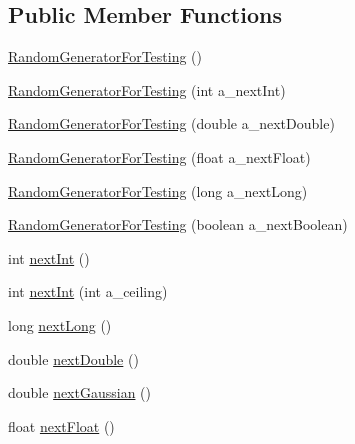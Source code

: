 \subsection*{Public Member Functions}
\begin{DoxyCompactItemize}
\item 
\hyperlink{classorg_1_1jgap_1_1impl_1_1_random_generator_for_testing_ab8a748759c1fdf976af85b5d88cb1b51}{Random\-Generator\-For\-Testing} ()
\item 
\hyperlink{classorg_1_1jgap_1_1impl_1_1_random_generator_for_testing_ae3a92dd2124c47e246d238b9743c7152}{Random\-Generator\-For\-Testing} (int a\-\_\-next\-Int)
\item 
\hyperlink{classorg_1_1jgap_1_1impl_1_1_random_generator_for_testing_afef3e231a7d3b2ef02b6bf8360e644b1}{Random\-Generator\-For\-Testing} (double a\-\_\-next\-Double)
\item 
\hyperlink{classorg_1_1jgap_1_1impl_1_1_random_generator_for_testing_a3f949d34641acf47a090e30a59553bb1}{Random\-Generator\-For\-Testing} (float a\-\_\-next\-Float)
\item 
\hyperlink{classorg_1_1jgap_1_1impl_1_1_random_generator_for_testing_a9ae2b4d98da1324479a462964051131d}{Random\-Generator\-For\-Testing} (long a\-\_\-next\-Long)
\item 
\hyperlink{classorg_1_1jgap_1_1impl_1_1_random_generator_for_testing_a3960916ba205bcfacf4ef29a30e3f295}{Random\-Generator\-For\-Testing} (boolean a\-\_\-next\-Boolean)
\item 
int \hyperlink{classorg_1_1jgap_1_1impl_1_1_random_generator_for_testing_a09291b8911a0e5a40ef220996bef2548}{next\-Int} ()
\item 
int \hyperlink{classorg_1_1jgap_1_1impl_1_1_random_generator_for_testing_af4432e24f059c196da9857b504fc57f3}{next\-Int} (int a\-\_\-ceiling)
\item 
long \hyperlink{classorg_1_1jgap_1_1impl_1_1_random_generator_for_testing_a38d256f5c65520b6fe18da0c6b4bb015}{next\-Long} ()
\item 
double \hyperlink{classorg_1_1jgap_1_1impl_1_1_random_generator_for_testing_a529f3202c9e0d37f47775a215944e86a}{next\-Double} ()
\item 
double \hyperlink{classorg_1_1jgap_1_1impl_1_1_random_generator_for_testing_a5d372823adf022517f1a35007eb6290d}{next\-Gaussian} ()
\item 
float \hyperlink{classorg_1_1jgap_1_1impl_1_1_random_generator_for_testing_ace93d32fbe3985cbdcc364ee53ca3a1c}{next\-Float} ()
\item 

\end{DoxyCompactItemize}
